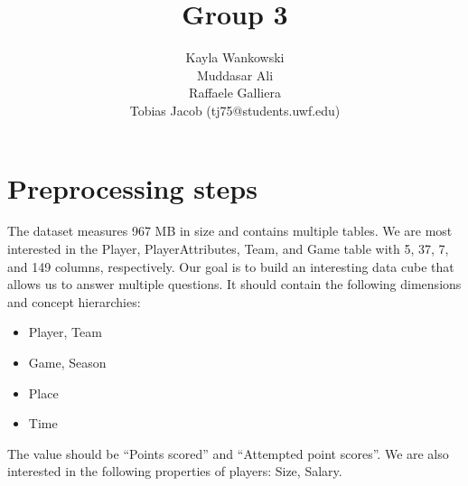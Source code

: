 \documentclass{article}
\begin{document}
\title{Group 3}
\author{
    Kayla Wankowski\\
    Muddasar Ali\\
    Raffaele Galliera\\
    Tobias Jacob (tj75@students.uwf.edu)
}

\maketitle

\section{Preprocessing steps}
The dataset measures 967 MB in size and contains multiple tables.
We are most interested in the Player, PlayerAttributes, Team, and Game table with 5, 37, 7, and 149 columns, respectively.
Our goal is to build an interesting data cube that allows us to answer multiple questions.
It should contain the following dimensions and concept hierarchies:
\begin{itemize}
    \item Player, Team
    \item Game, Season
    \item Place
    \item Time
\end{itemize}
The value should be ``Points scored'' and ``Attempted point scores''. We are also interested in the following properties of players: Size, Salary.
\end{document}
